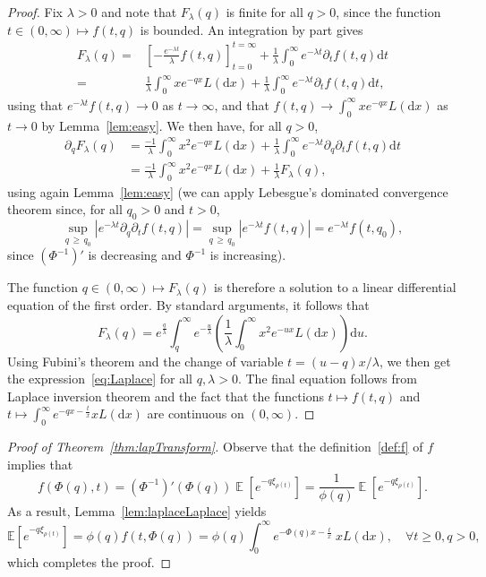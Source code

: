 \documentclass[10pt]{amsart}
\theoremstyle{definition}
\numberwithin{equation}{section}
\newcommand{\bbE}{\mathbb{E}}
\DeclareMathOperator{\E}{\mathbb{E}}
\newcommand{\dd}{\mathrm{d}}
\let\oldforall\forall
\renewcommand*{\forall}{\mathrel{\oldforall}}
\begin{document}
\begin{proof}
Fix $\lambda > 0$ and note that $F_{\lambda}(q)$ is finite for all $q > 0$, since the function $t \in (0,\infty) \mapsto f(t,q)$ is bounded. An integration by part gives
\begin{align*}
F_{\lambda}(q)=& \left[-\frac{e^{-\lambda t}}{\lambda}f(t,q) \right]_{t=0}^{t=\infty} + \frac{1}{\lambda} \int_0^{\infty}e^{-\lambda t} \partial _t f(t,q) \dd t \\
=& \frac{1}{\lambda} \int_0^{\infty} xe^{-qx} L(\dd x)+\frac{1}{\lambda} \int_0^{\infty}e^{-\lambda t} \partial _t f(t,q) \dd t,
\end{align*}
using that $e^{-\lambda t}f(t,q) \rightarrow 0 $ as $t\rightarrow \infty$, and that $f(t,q) \rightarrow \int_0^{\infty} xe^{-qx} L(\dd x)$ as $t \rightarrow 0$ by Lemma~\ref{lem:easy}. We then have, for all $q>0$,
\begin{align*}
\partial_q F_{\lambda}(q)&= \frac{-1}{\lambda} \int_0^{\infty} x^2e^{-qx} L(\dd x)+ \frac{1}{\lambda} \int_0^{\infty}e^{-\lambda t} \partial _q\partial _t f(t,q) \dd t \\
&= \frac{-1}{\lambda} \int_0^{\infty} x^2e^{-qx} L(\dd x)+ \frac{1}{\lambda} F_{\lambda}(q),
\end{align*}
using again Lemma~\ref{lem:easy} (we can apply Lebesgue's dominated convergence theorem since, for all $q_0>0$ and $t>0$,
\[
\sup_{q\,\geq\,q_0} \left|e^{-\lambda t}\partial_q \partial_t f(t,q)\right|=\sup_{q\,\geq\,q_0} \left|e^{-\lambda t} f(t,q)\right|=e^{-\lambda t} f(t,q_0),
\]
since $(\Phi^{-1})'$ is decreasing and $\Phi^{-1}$ is increasing).

The function $q \in (0,\infty) \mapsto F_{\lambda}(q)$ is therefore a solution to a linear differential equation of the first order. By standard arguments, it follows that
\[
F_{\lambda}(q)=e^{\frac{q}{\lambda}}\int_q^{\infty} e^{-\frac{u}{\lambda}} \left(\frac{1}{\lambda} \int_0^{\infty} x^2e^{-ux} L(\dd x) \right) \dd u.
\]
Using Fubini's theorem and the change of variable $t=(u-q)x/\lambda$, we then get the expression~\eqref{eq:Laplace} for all $q,\lambda>0$. The final equation follows from Laplace inversion theorem and the fact that the functions $t\mapsto f(t,q)$ and $t \mapsto \int_0^{\infty} e^{-qx -\frac{t}{x}} xL(\dd x)$ are continuous on $(0,\infty)$.
\end{proof}


\begin{proof}[{Proof of Theorem~\ref{thm:lapTransform}}]
Observe that the definition~\eqref{def:f} of $f$ implies that
\[
f(\Phi(q),t) = (\Phi^{-1})'(\Phi(q)) \E\left[e^{-q \xi_{\rho(t)}} \right] = \frac{1}{\phi(q)}\E\left[e^{-q \xi_{\rho(t)}} \right].
\]
As a result, Lemma~\ref{lem:laplaceLaplace} yields
\[
\bbE\left[e^{-q\xi_{\rho(t)}}\right] = \phi(q) f\left(t,\Phi(q)\right)=\phi(q) \int_0^{\infty} e^{-\Phi(q)x -\frac{t}{x}} \ xL(\dd x), \quad \forall t\geq 0, q>0,
\]
which completes the proof.
\end{proof}
\end{document}
